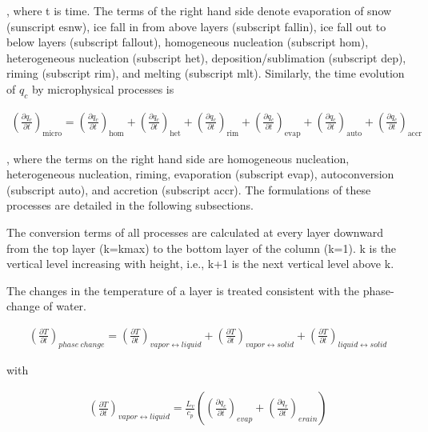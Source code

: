 , where t is time. The terms of the right hand side denote evaporation of snow (sunscript esnw), ice fall in from above layers (subscript fallin), ice fall out to below layers (subscript fallout),
homogeneous nucleation (subscript hom), heterogeneous nucleation (subscript het), deposition/sublimation (subscript dep), riming (subscript rim), and melting (subscript mlt). Similarly, the time
evolution of \(q_c\) by microphysical processes is

\begin{eqnarray}
\left(\frac{\partial q_c}{\partial t}\right)_{\text {micro}}
=\left(\frac{\partial q_c}{\partial t}\right)_{\text {hom}}
+\left(\frac{\partial q_c}{\partial t}\right)_{\text {het}}
+\left(\frac{\partial q_c}{\partial t}\right)_{\text {rim}}
+\left(\frac{\partial q_c}{\partial t}\right)_{\text {evap}}
+\left(\frac{\partial q_c}{\partial t}\right)_{\text {auto}}
+\left(\frac{\partial q_c}{\partial t}\right)_{\text {accr}}
\end{eqnarray}

, where the terms on the right hand side are homogeneous nucleation, heterogeneous nucleation, riming, evaporation (subscript evap), autoconversion (subscript auto), and accretion (subscript accr).
The formulations of these processes are detailed in the following subsections.

The conversion terms of all processes are calculated at every layer downward from the top layer (k=kmax) to the bottom layer of the column (k=1). k is the vertical level increasing with height, i.e.,
k+1 is the next vertical level above k.

The changes in the temperature of a layer is treated consistent with the phase-change of water.

\begin{eqnarray}
\left(\frac{\partial T}{\partial t}\right)_{phase~change}=\left(\frac{\partial T}{\partial t}\right)_{vapor \leftrightarrow liquid}+\left(\frac{\partial T}{\partial t}\right)_{vapor \leftrightarrow solid}+\left(\frac{\partial T}{\partial t}\right)_{liquid \leftrightarrow solid}
\end{eqnarray}

with

\begin{eqnarray}
\left(\frac{\partial T}{\partial t}\right)_{vapor \leftrightarrow liquid}
=\frac{L_{v}}{c_{p}}\left(
\left(\frac{\partial q_c}{\partial t}\right)_{evap}
+\left(\frac{\partial q_r}{\partial t}\right)_{erain}
\right)
\end{eqnarray}

